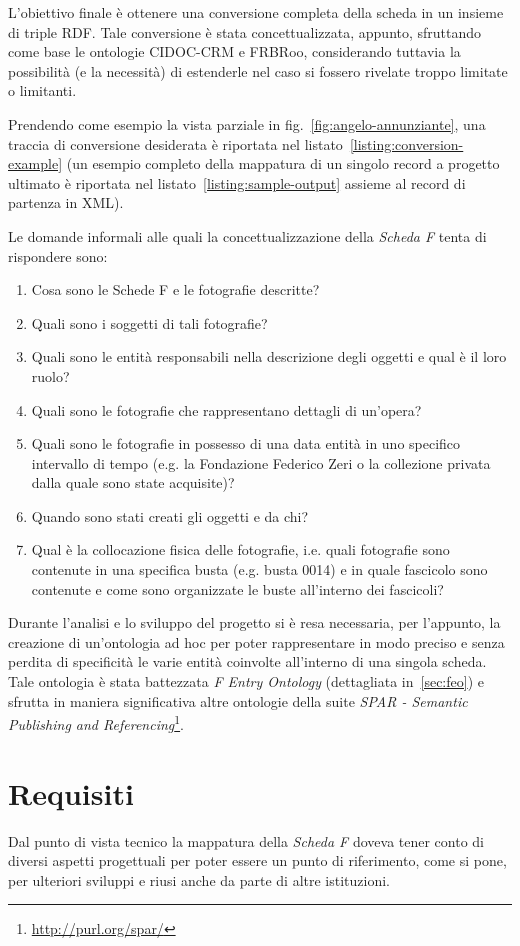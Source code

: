 L'obiettivo finale è ottenere una conversione completa della scheda in un insieme di triple RDF. Tale conversione è stata concettualizzata, appunto, sfruttando come base le ontologie CIDOC-CRM e FRBRoo, considerando tuttavia la possibilità (e la necessità) di estenderle nel caso si fossero rivelate troppo limitate o limitanti.

Prendendo come esempio la vista parziale in fig.~\ref{fig:angelo-annunziante}, una traccia di conversione desiderata è riportata nel listato~\ref{listing:conversion-example} (un esempio completo della mappatura di un singolo record a progetto ultimato è riportata nel listato~\ref{listing:sample-output} assieme al record di partenza in XML).

Le domande informali alle quali la concettualizzazione della \emph{Scheda F} tenta di rispondere sono:
\begin{enumerate}
\item Cosa sono le Schede F e le fotografie descritte?
\item Quali sono i soggetti di tali fotografie?
\item Quali sono le entità responsabili nella descrizione degli oggetti e qual è il loro ruolo?
\item Quali sono le fotografie che rappresentano dettagli di un'opera?
\item Quali sono le fotografie in possesso di una data entità in uno specifico intervallo di tempo (e.g. la Fondazione Federico Zeri o la collezione privata dalla quale sono state acquisite)?
\item Quando sono stati creati gli oggetti e da chi?
\item Qual è la collocazione fisica delle fotografie, i.e. quali fotografie sono contenute in una specifica busta (e.g. busta 0014) e in quale fascicolo sono contenute e come sono organizzate le buste all'interno dei fascicoli?
\end{enumerate}

Durante l'analisi e lo sviluppo del progetto si è resa necessaria, per l'appunto, la creazione di un'ontologia ad hoc per poter rappresentare in modo preciso e senza perdita di specificità le varie entità coinvolte all'interno di una singola scheda. Tale ontologia è stata battezzata \emph{F Entry Ontology} (dettagliata in~\ref{sec:feo}) e sfrutta in maniera significativa altre ontologie della suite \emph{SPAR - Semantic Publishing and Referencing}\footnote{\url{http://purl.org/spar/}}.

\section{Requisiti}
Dal punto di vista tecnico la mappatura della \emph{Scheda F} doveva tener conto di diversi aspetti progettuali per poter essere un punto di riferimento, come si pone, per ulteriori sviluppi e riusi anche da parte di altre istituzioni.

